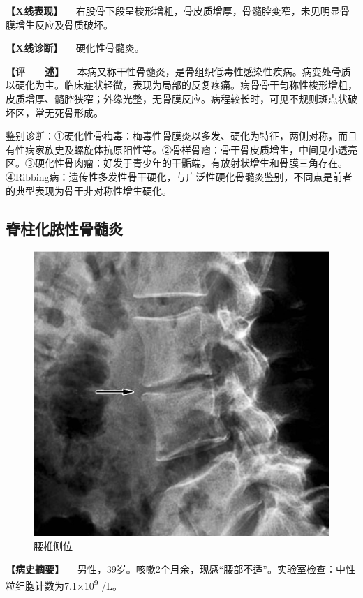 \textbf{【X线表现】}
　右股骨下段呈梭形增粗，骨皮质增厚，骨髓腔变窄，未见明显骨膜增生反应及骨质破坏。

\textbf{【X线诊断】} 　硬化性骨髓炎。

\textbf{【评　　述】}
　本病又称干性骨髓炎，是骨组织低毒性感染性疾病。病变处骨质以硬化为主。临床症状轻微，表现为局部的反复疼痛。病骨骨干匀称性梭形增粗，皮质增厚、髓腔狭窄；外缘光整，无骨膜反应。病程较长时，可见不规则斑点状破坏区，常无死骨形成。

鉴别诊断：①硬化性骨梅毒：梅毒性骨膜炎以多发、硬化为特征，两侧对称，而且有性病家族史及螺旋体抗原阳性等。②骨样骨瘤：骨干骨皮质增生，中间见小透亮区。③硬化性骨肉瘤：好发于青少年的干骺端，有放射状增生和骨膜三角存在。④Ribbing病：遗传性多发性骨干硬化，与广泛性硬化骨髓炎鉴别，不同点是前者的典型表现为骨干非对称性增生硬化。

\subsection{脊柱化脓性骨髓炎}

\begin{figure}[!htbp]
 \centering
 \includegraphics{./images/Image00075.jpg}
 \captionsetup{justification=centering}
 \caption{腰椎侧位}
 \label{fig2-5-5}
  \end{figure} 

\textbf{【病史摘要】}
　男性，39岁。咳嗽2个月余，现感“腰部不适”。实验室检查：中性粒细胞计数为7.1×10\textsuperscript{9}
/L。

